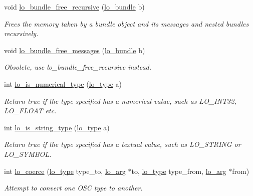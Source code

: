 \begin{DoxyCompactItemize}
void \hyperlink{group__liblolowlevel_ga8ec7b8729ab98094619285ebe11f0d00}{lo\+\_\+bundle\+\_\+free\+\_\+recursive} (\hyperlink{lo__types_8h_a96254950ad34e9cfbf8a6613fc74025b}{lo\+\_\+bundle} b)
\begin{DoxyCompactList}\small\item\em Frees the memory taken by a bundle object and its messages and nested bundles recursively. \end{DoxyCompactList}\item 
void \hyperlink{group__liblolowlevel_ga2773611a57270837fff398b716fa8459}{lo\+\_\+bundle\+\_\+free\+\_\+messages} (\hyperlink{lo__types_8h_a96254950ad34e9cfbf8a6613fc74025b}{lo\+\_\+bundle} b)
\begin{DoxyCompactList}\small\item\em Obsolete, use lo\+\_\+bundle\+\_\+free\+\_\+recursive instead. \end{DoxyCompactList}\item 
int \hyperlink{group__liblolowlevel_gace222e42c35d0256f115e00b84e8f853}{lo\+\_\+is\+\_\+numerical\+\_\+type} (\hyperlink{group__liblo_ga11838c576b0197c255ce805fd7434736}{lo\+\_\+type} a)
\begin{DoxyCompactList}\small\item\em Return true if the type specified has a numerical value, such as L\+O\+\_\+\+I\+N\+T32, L\+O\+\_\+\+F\+L\+O\+A\+T etc. \end{DoxyCompactList}\item 
int \hyperlink{group__liblolowlevel_gaeb9f59d9f7bf8d50f21809e44889eee7}{lo\+\_\+is\+\_\+string\+\_\+type} (\hyperlink{group__liblo_ga11838c576b0197c255ce805fd7434736}{lo\+\_\+type} a)
\begin{DoxyCompactList}\small\item\em Return true if the type specified has a textual value, such as L\+O\+\_\+\+S\+T\+R\+I\+N\+G or L\+O\+\_\+\+S\+Y\+M\+B\+O\+L. \end{DoxyCompactList}\item 
int \hyperlink{group__liblolowlevel_gaf85d7a54ab80e1b2a3d17c4cfef38402}{lo\+\_\+coerce} (\hyperlink{group__liblo_ga11838c576b0197c255ce805fd7434736}{lo\+\_\+type} type\+\_\+to, \hyperlink{unionlo__arg}{lo\+\_\+arg} $\ast$to, \hyperlink{group__liblo_ga11838c576b0197c255ce805fd7434736}{lo\+\_\+type} type\+\_\+from, \hyperlink{unionlo__arg}{lo\+\_\+arg} $\ast$from)
\begin{DoxyCompactList}\small\item\em Attempt to convert one O\+S\+C type to another. \end{DoxyCompactList}\item 

\end{DoxyCompactItemize}
